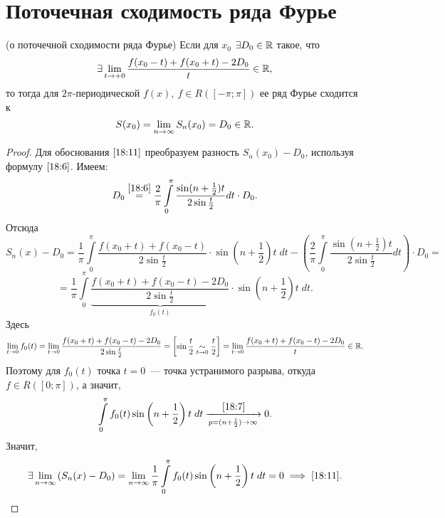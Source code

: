 \documentclass[../../main.tex]{subfiles}
\begin{document}
\section{Поточечная сходимость ряда Фурье}
\begin{thm}(о поточечной сходимости ряда Фурье)
	Если для $x_0$ $\exists D_0 \in \mathbb{R}$ такое, что
	\[\exists \lim\limits_{t \rightarrow +0}{\dfrac
		{f(x_0 - t) + f(x_0 + t) - 2D_0}{t}} \in \mathbb{R},\] то тогда для
	$2\pi$-периодической $f(x),\ f \in R([-\pi; \pi])$ ее ряд Фурье
	сходится к
	\begin{equation}
		\label{18:11}
		S(x_0) = \lim\limits_{n \rightarrow \infty}S_n(x_0) = D_0 \in \mathbb{R}.
	\end{equation}
\end{thm}
\begin{proof}
	Для обоснования $\eqref{18:11}$ преобразуем разность 
	$S_n(x_0) - D_0$, используя формулу $\eqref{18:6}$. Имеем:
	\[D_0 \stackrel{\eqref{18:6}}{=} \dfrac{2}{\pi}
	\int\limits_{0}^{\pi}{\dfrac{\sin(n+\frac{1}{2})t}{2\sin\frac{t}{2}}
	dt} \cdot D_0.\]
	Отсюда
	\[S_n(x) - D_0 = \dfrac{1}{\pi}\int\limits_{0}^{\pi}
	{\dfrac{f(x_0 + t) + f(x_0 - t)}{2\sin\frac{t}{2}}} \cdot 
	\sin\left(n + \frac{1}{2}\right)t\;dt - 
	\left(\dfrac{2}{\pi}\int\limits_{0}^{\pi}
	\dfrac{\sin(n + \frac{1}{2})t}{2\sin\frac{t}{2}}dt\right)\cdot D_0 =\]
	\[= \dfrac{1}{\pi}\int\limits_{0}^{\pi}{\underbrace{\frac{f(x_0 + t) +
		f(x_0 - t) - 2D_0}{2\sin\frac{t}{2}}}_{f_0(t)}}\cdot\sin\left(n + 
		\dfrac{1}{2}\right)t\;dt.\]
	Здесь
	\[\lim\limits_{t \rightarrow 0}{f_0(t)} = 
	\lim\limits_{t \rightarrow 0}{\dfrac{f(x_0 + t) + f(x_0 - t) - 2D_0}
		{2\sin\frac{t}{2}}} =
	\left[ 
	\begin{gathered} 
	\sin\dfrac{t}{2} \underset {t \rightarrow 0}{\sim} \dfrac{t}{2} 
	\end{gathered} 
	\right]  =
	\lim\limits_{t \rightarrow 0}{\dfrac{f(x_0 + t) + f(x_0 - t)-
		2D_0}t} \in \mathbb{R}.\]
	Поэтому для $f_0(t)$ точка $t = 0$~--- точка устранимого разрыва, откуда
	$f \in R([0; \pi])$, а значит,
	\[\int\limits_{0}^{\pi}{f_0(t)\sin\left(n+\dfrac{1}{2}\right)t\;dt} 
	\stk{18:7}{\appr
		{p=(n+\frac{1}{2}) \rightarrow \infty}} 0.\]
	Значит, \[\exists \lim\limits_{n \rightarrow \infty}{(
		S_n(x) - D_0)} = \lim\limits_{n\rightarrow \infty}
	{\dfrac{1}{\pi}} \int\limits_{0}^{\pi} 
	{f_0(t)\sin\left(n+\dfrac{1}{2}\right)t\;dt} = 0
	\implies \eqref{18:11}. \qedhere\]
\end{proof}
\end{document}
